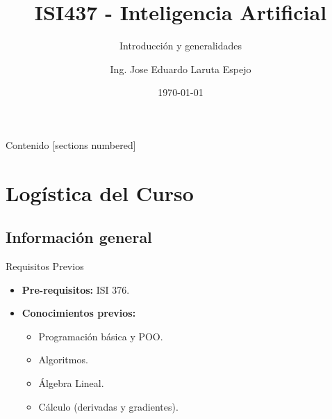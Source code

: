 \documentclass[10pt]{beamer}
\title{ISI437 - Inteligencia Artificial}
\subtitle{Introducción y generalidades}
\date{\today}
\author{Ing. Jose Eduardo Laruta Espejo}
\institute{Universidad La Salle - Bolivia}
\begin{document}
\maketitle

\begin{frame}[allowframebreaks]{Contenido}
  [sections numbered]
  \tableofcontents[]
\end{frame}


\section{Logística del Curso}
\subsection{Información general}
\begin{frame}{Requisitos Previos}
    \begin{itemize}
        \item \textbf{Pre-requisitos:} ISI 376.
        \item \textbf{Conocimientos previos:}
            \begin{itemize}
                \item Programación básica y POO.
                \item Algoritmos.
                \item Álgebra Lineal.
                \item Cálculo (derivadas y gradientes).
            \end{itemize}
    \end{itemize}
\end{frame}
\end{document}
